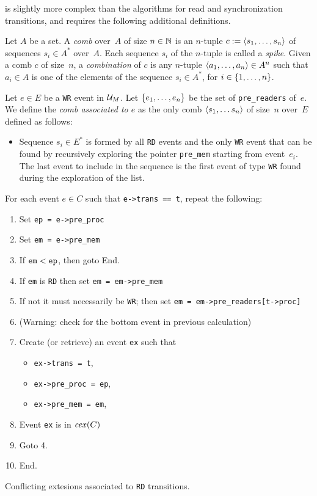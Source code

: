 \documentclass{llncs}
\begin{document}
 is slightly more complex than the algorithms for read and
synchronization transitions, and requires the following additional definitions.

Let $A$ be a set.
A \emph{comb} over~$A$ of size $n \in \mathbb{N}$ is an $n$-tuple
$c \mathrel{:=} \langle s_1, \ldots, s_n\rangle$ of sequences $s_i \in A^*$
over~$A$.
Each sequence $s_i$ of the $n$-tuple is called a \emph{spike}.
Given a comb $c$ of size~$n$,
a \emph{combination} of $c$ is any $n$-tuple $\langle a_1, \ldots, a_n\rangle \in A^n$
such that $a_i \in A$ is one of the elements of the sequence $s_i \in A^*$, for
$i \in {\{ 1, \ldots, n \mathclose \}}$.

Let $e \in E$ be a \verb!WR! event in $\mathcal{U}_{M}$.
Let ${\{ e_1, \ldots, e_n \mathclose \}}$ be the set of \verb!pre_readers! of~$e$.
We define the \emph{comb associated to $e$} as the only comb
$\langle s_1, \ldots s_n\rangle$ of size~$n$ over~$E$ defined as follows:
\begin{itemize}
\item
  Sequence $s_i \in E^*$ is formed by all \verb!RD! events and the only
  \verb!WR! event that can be found by recursively exploring the pointer
  \verb!pre_mem! starting from event~$e_i$. The last event to include in the
  sequence is the first event of type \verb!WR! found during the exploration of
  the list.
\end{itemize}


\begin{algorithm}
\noindent
For each event $e \in C$ such that \verb!e->trans == t!, repeat the following:
\begin{enumerate}
\item Set \verb!ep = e->pre_proc!
\item Set \verb!em = e->pre_mem!
\item If $\verb!em! < \verb!ep!$, then goto End.
\item If \verb!em! is \verb!RD! then set \verb!em = em->pre_mem!
\item If not it must necessarily be \verb!WR!; then set \verb!em = em->pre_readers[t->proc]!
\item (Warning: check for the bottom event in previous calculation)
\item
  Create (or retrieve) an event \verb!ex! such that
  \begin{itemize}
  \item \verb!ex->trans = t!,
  \item \verb!ex->pre_proc = ep!,
  \item \verb!ex->pre_mem = em!,
  \end{itemize}
\item Event \verb!ex! is in $\mathop{\mathit{cex}} (C)$
\item Goto 4.
\item End.
\end{enumerate}
\caption{Conflicting extesions associated to \texttt{RD} transitions.}
\label{a:cex_rd}
\end{algorithm}
\end{document}
